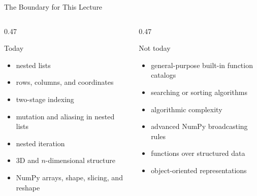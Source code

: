 \documentclass[aspectratio=169,10pt]{beamer}
\begin{document}
\begin{frame}{The Boundary for This Lecture}
  \begin{columns}[T,onlytextwidth]
    \begin{column}{0.47\textwidth}
      \begin{block}{Today}
        \begin{itemize}
          \item nested lists
          \item rows, columns, and coordinates
          \item two-stage indexing
          \item mutation and aliasing in nested lists
          \item nested iteration
          \item 3D and $n$-dimensional structure
          \item NumPy arrays, shape, slicing, and reshape
        \end{itemize}
      \end{block}
    \end{column}
    \begin{column}{0.47\textwidth}
      \begin{alertblock}{Not today}
        \begin{itemize}
          \item general-purpose built-in function catalogs
          \item searching or sorting algorithms
          \item algorithmic complexity
          \item advanced NumPy broadcasting rules
          \item functions over structured data
          \item object-oriented representations
        \end{itemize}
      \end{alertblock}
    \end{column}
  \end{columns}
\end{frame}

\end{document}
